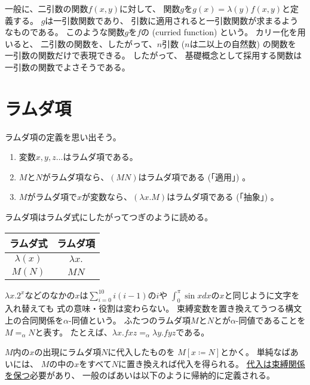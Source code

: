\documentclass[fleqn]{jsarticle}
\begin{document}
一般に、二引数の関数$f(x,y)$に対して、
関数$g$を$g(x) = \lambda (y) f(x,y)$と定義する。
$g$は一引数関数であり、
引数に適用されると一引数関数が求まるようなものである。
このような関数$g$を$f$の (curried function) という。
カリー化を用いると、
二引数の関数を、したがって、$n$引数 ($n$は二以上の自然数) の関数を
一引数の関数だけで表現できる。
したがって、
基礎概念として採用する関数は一引数の関数でよさそうである。

\section{ラムダ項}


ラムダ項の定義を思い出そう。

\begin{enumerate}
    \item 変数$x, y, z \ldots$はラムダ項である。
    \item $M$と$N$がラムダ項なら、$(MN)$はラムダ項である (「適用」) 。
    \item $M$がラムダ項で$x$が変数なら、$(\lambda x. M)$はラムダ項である (「抽象」) 。
\end{enumerate}

ラムダ項はラムダ式にしたがってつぎのように読める。

\begin{center}
  \begin{tabular}{c|c}
   ラムダ式      & ラムダ項\\ \hline
   $\lambda (x)$ & $\lambda x.$\\
   $M(N)$        & $MN$
  \end{tabular}
\end{center}


$\lambda x. 2^x$などのなかの$x$は$\sum_{i=0}^{10} i(i-1)$の$i$や
$\int_0^{\pi} \sin x dx$の$x$と同じように文字を入れ替えても
式の意味・役割は変わらない。
束縛変数を置き換えてうつる構文上の合同関係を$\alpha$-同値という。
ふたつのラムダ項$M$と$N$とが$\alpha$-同値であることを
$M =_{\alpha} N$と表す。
たとえば、$\lambda x.fxz =_{\alpha} \lambda y.fyz$である。
 
$M$内の$x$の出現にラムダ項$N$に代入したものを
$M[x \coloneqq N]$とかく。
単純なばあいには、
$M$の中の$x$をすべて$N$に置き換えれば代入を得られる。
\underline{代入は束縛関係を保つ}必要があり、
一般のばあいは以下のように帰納的に定義される。
\end{document}
